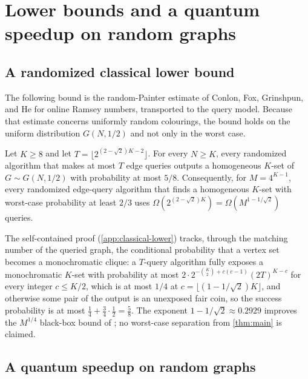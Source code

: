 \section{Lower bounds and a quantum speedup on random graphs}\label{sec:lower}

\subsection{A randomized classical lower bound}
\label{sec:classical-lower}

The following bound is the random-Painter estimate of Conlon, Fox,
Grinshpun, and He \cite[proof of Theorem~1]{ConlonFoxGrinshpunHe2019} for
online Ramsey numbers, transported to the query model.  Because that
estimate concerns uniformly random colourings, the bound holds on the
uniform distribution $G(N,1/2)$ and not only in the worst case.

\begin{proposition}
\label{prop:classical-lower}
Let $K\ge8$ and let $T=\lfloor2^{(2-\sqrt2)K-2}\rfloor$.  For every
$N\ge K$, every randomized algorithm that makes at most $T$ edge queries
outputs a homogeneous $K$-set of $G\sim G(N,1/2)$ with probability at most
$5/8$.  Consequently, for $M=4^{K-1}$, every randomized edge-query
algorithm that finds a homogeneous $K$-set with worst-case probability at
least $2/3$ uses
$\Omega(2^{(2-\sqrt2)K})=\Omega(M^{1-1/\sqrt2})$ queries.
\end{proposition}

The self-contained proof (\cref{app:classical-lower}) tracks, through the
matching number of the queried graph, the conditional probability that a
vertex set becomes a monochromatic clique: a $T$-query algorithm fully
exposes a monochromatic $K$-set with probability at most
$2\cdot2^{-\binom K2+c(c-1)}(2T)^{K-c}$ for every integer $c\le K/2$, which
is at most $1/4$ at $c=\lfloor(1-1/\sqrt2)K\rfloor$, and otherwise some pair
of the output is an unexposed fair coin, so the success probability is at
most $\frac14+\frac34\cdot\frac12=\frac58$.  The exponent
$1-1/\sqrt2\approx0.2929$ improves the $M^{1/4}$ black-box bound of
\cite{ImpagliazzoNaor1988,KomargodskiNaorYogev2019}; no worst-case
separation from \cref{thm:main} is claimed.

\subsection{A quantum speedup on random graphs}
\label{sec:random-graphs}

